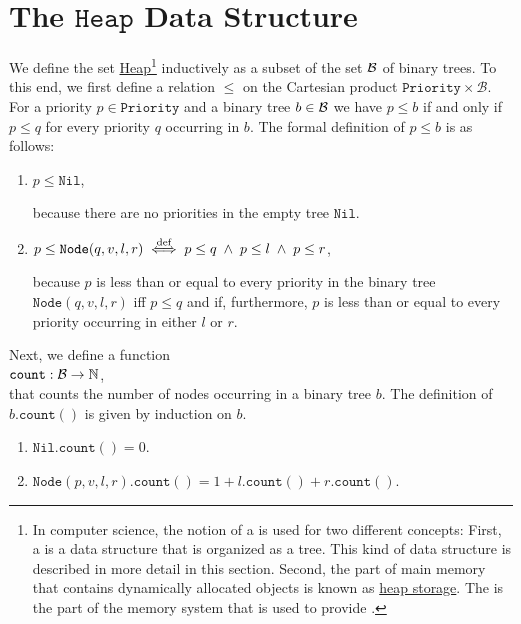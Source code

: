 \section[Heaps]{The $\texttt{Heap}$ Data Structure}
We define the set \href{https://en.wikipedia.org/wiki/Heap_(data_structure)}{Heap}\footnote{
In computer science, the notion of a  is used for two different concepts:
First, a  is a data structure that is organized as a tree.  This kind of data structure
is described in more detail in this section. Second, the part of main memory that contains dynamically
allocated objects is known as \href{https://en.wikibooks.org/wiki/Memory_Management/Stacks_and_Heaps}{heap storage}.
The  is the part of the memory system that is used to provide .
}
inductively as a subset of the set $\mathcal{B}$ of binary trees.  To this end, we first define a relation
$\leq$ on the Cartesian product $\texttt{Priority} \times \mathcal{B}$.
For a priority $p \in \texttt{Priority}$ and a binary tree $b \in \mathcal{B}$ we have  $p \leq b$ 
if and only if $p \leq q$ for every priority $q$ occurring in $b$.  The formal definition of 
$p \leq b$ is as follows:
\begin{enumerate}
\item $p \leq \texttt{Nil}$,

      because there are no priorities in the empty tree $\texttt{Nil}$.
\item $p \leq \texttt{Node}(q,v,l,r) \;\stackrel{\mbox{\scriptsize def}}{\Longleftrightarrow}\; p \leq q \;\wedge\; p \leq l \;\wedge\; p \leq r$,
         
      because $p$ is less than or equal to every priority in the binary tree 
      $\texttt{Node}(q,v,l,r)$ iff  $p \leq q$ and if, furthermore, 
      $p$ is less than or equal to every priority occurring in either  $l$ or $r$.
\end{enumerate}
Next, we define a function \\[0.1cm]
\hspace*{1.3cm} $\texttt{count}: \mathcal{B} \rightarrow \mathbb{N}$, \\[0.1cm]
that counts the number of nodes occurring in a binary tree $b$.  The definition of
$b.\texttt{count}()$ is given by induction on $b$.
\begin{enumerate}
\item $\texttt{Nil}.\texttt{count}() = 0$.
\item $\texttt{Node}(p,v,l,r).\texttt{count}() = 1 + l.\texttt{count}() + r.\texttt{count}()$.
\end{enumerate}
